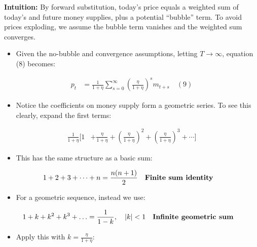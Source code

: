 \documentclass[12pt]{article}
\begin{document}
\textbf{Intuition:} By forward substitution, today’s price equals a weighted sum of today’s and future money supplies, plus a potential “bubble” term. To avoid prices exploding, we assume the bubble term vanishes and the weighted sum converges.

\begin{itemize}
    \item Given the no-bubble and convergence assumptions, letting $T \to \infty$, equation (8) becomes:  
\end{itemize}

\singlespacing
\begin{align}
p_t &= \frac{1}{1+\eta} \sum_{s=0}^{\infty} \left( \frac{\eta}{1+\eta} \right)^s m_{t+s} \quad (9)
\end{align}

\begin{itemize}
    \item Notice the coefficients on money supply form a geometric series. To see this clearly, expand the first terms:  
\end{itemize}

\singlespacing
\begin{align}
\frac{1}{1+\eta} \Big[ 1 &+ \frac{\eta}{1+\eta} + \left(\frac{\eta}{1+\eta}\right)^2 + \left(\frac{\eta}{1+\eta}\right)^3 + \cdots \Big] 
\end{align}

\begin{itemize}
    \item This has the same structure as a basic sum:  
\end{itemize}

\singlespacing
\begin{align}
1 + 2 + 3 + \dots + n &= \frac{n(n+1)}{2} && \text{\textbf{Finite sum identity}} 
\end{align}

\begin{itemize}
    \item For a geometric sequence, instead we use:  
\end{itemize}

\singlespacing
\begin{align}
1 + k + k^2 + k^3 + \dots &= \frac{1}{1-k}, \quad |k| < 1 && \text{\textbf{Infinite geometric sum}} 
\end{align}

\begin{itemize}
    \item Apply this with $k = \tfrac{\eta}{1+\eta}$:  
\end{itemize}
\end{document}

